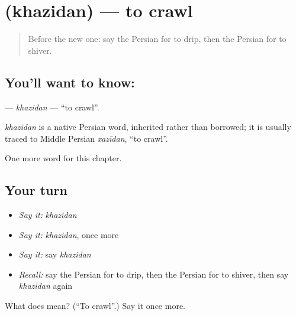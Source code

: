\section[\texorpdfstring{\fa{خزیدن} (khazidan)}{خزیدن (khazidan)}]{ (khazidan) — to crawl}

\label{lesson:FA-C186-khazidan}



\begin{quote}
Before the new one: say the Persian for to drip, then the Persian for to shiver.
\end{quote}

\subsection*{You'll want to know: }
\textbf{} — \emph{khazidan} — \textquotedblleft{}to crawl\textquotedblright{}.

\begin{cousinweb}
\emph{khazidan} is a native Persian word, inherited rather than borrowed; it is usually traced to Middle Persian \emph{xazīdan}, \textquotedblleft{}to crawl\textquotedblright{}.
\end{cousinweb}

\begin{grammarlens}[title={What you've built}]
One more word for this chapter.
\end{grammarlens}

\subsection*{Your turn}
\begin{itemize}
\raggedright
  \item \emph{Say it:} \emph{khazidan}
  \item \emph{Say it:} \emph{khazidan}, once more
  \item \emph{Say it:} say \emph{khazidan}
  \item \emph{Recall:} say the Persian for to drip, then the Persian for to shiver, then say \emph{khazidan} again
\end{itemize}

\begin{tcolorbox}[breakable,colback=teal!4,colframe=teal!35!black,title={Before you move on}]
What does  mean? (\textquotedblleft{}To crawl\textquotedblright{}.) Say it once more.
\end{tcolorbox}
